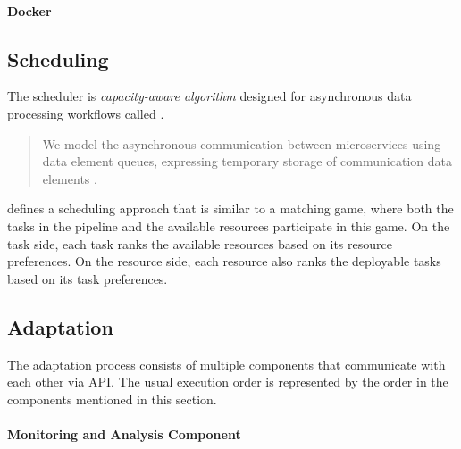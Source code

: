       \paragraph{Docker}



    \subsection{Scheduling}
    \label{sec:scheduling-saa-background}

      The scheduler is \emph{capacity-aware algorithm} designed for asynchronous data processing workflows called \CMATCH.

      \begin{quote}
          We model the asynchronous communication between microservices using data element queues, expressing temporary storage of communication data elements \cite{mehranMatchingbasedSchedulingAsynchronous2022}.
      \end{quote} 
      \CMATCH defines a scheduling approach that is similar to a matching game, where both the tasks in the pipeline and the available resources participate in this game.
      On the task side, each task ranks the available resources based on its resource preferences.
      On the resource side, each resource also ranks the deployable tasks based on its task preferences.

    \subsection{Adaptation}
    \label{sec:adaptation-saa-background}

        The adaptation process consists of multiple components that communicate with each other via API.
        The usual execution order is represented by the order in the components mentioned in this section.
        

        \paragraph{Monitoring and Analysis Component}
        \label{par:monitoring-component-saa-background}
        
